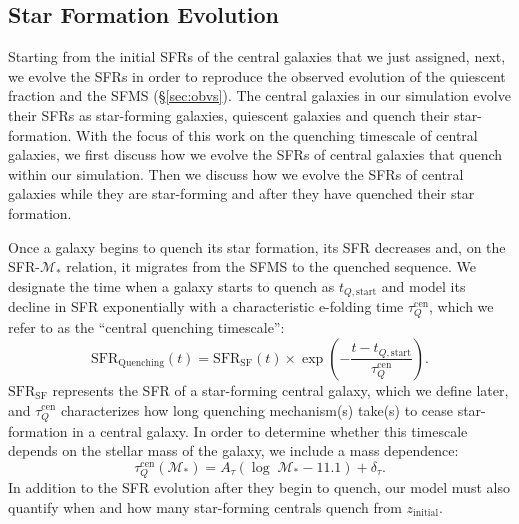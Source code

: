 \documentclass[iop,apj,tighten,twocolappendix,numberedappendix]{emulateapj}
\newcommand{\beq}{\begin{equation}}
\newcommand{\eeq}{\end{equation}}
\newcommand{\zinit}{z_\mathrm{initial}}
\begin{document}

\subsection{Star Formation Evolution} \label{sec:sfms_evol}
Starting from the initial SFRs of the central galaxies that we just 
assigned, next, we evolve the SFRs in order to reproduce the observed 
evolution of the quiescent fraction and the SFMS (\S \ref{sec:obvs}). 
The central galaxies in our simulation evolve their SFRs as 
star-forming galaxies, quiescent galaxies and quench their 
star-formation. With the focus of this work 
on the quenching timescale of central galaxies, we first discuss 
how we evolve the SFRs of central galaxies that quench within 
our simulation. Then we discuss how we evolve the 
SFRs of central galaxies while they are star-forming and after they 
have quenched their star formation. 

Once a galaxy begins to quench its star formation, its SFR decreases
and, on the SFR-$\mathcal{M}_*$ relation, it migrates from the SFMS 
to the quenched sequence. We designate the time when a galaxy starts 
to quench as $t_{Q, \mathrm{start}}$ and model its decline in SFR
exponentially with a characteristic e-folding time $\tau_Q^\mathrm{cen}$,
which we refer to as the ``central quenching timescale'': 
\beq \label{eq:quenching}
\mathrm{SFR}_\mathrm{Quenching}(t) = \mathrm{SFR}_\mathrm{SF}(t) \times 
\exp \left(-\frac{t-t_{Q,\mathrm{start}}}{\tau^\mathrm{cen}_Q}\right).
\eeq
$\mathrm{SFR}_\mathrm{SF}$ represents the SFR of a star-forming central 
galaxy, which we define later, and $\tau_Q^\mathrm{cen}$ characterizes 
how long quenching mechanism(s) 
take(s) to cease star-formation in a central galaxy. In order to determine 
whether this timescale depends on the stellar mass of the galaxy, 
we include a mass dependence:
\beq \label{eq:tauq}
\tau_Q^\mathrm{cen}(\mathcal{M}_*) = 
A_\tau \left(\log\;\mathcal{M}_* - 11.1 \right) + \delta_\tau.
\eeq
In addition to the SFR evolution after they begin to quench, 
our model must also quantify when and how many star-forming
centrals quench from $\zinit$. 
\end{document}
